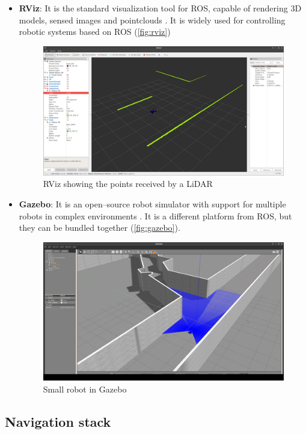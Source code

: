 \begin{itemize}
  \item \textbf{RViz}: It is the standard visualization tool for ROS, capable of rendering 3D models, sensed images and pointclouds . It is widely used for controlling robotic systems based on ROS (\autoref{fig:rviz})
  \begin{figure}[htb]
    \centering
    \includegraphics[width=.9\linewidth]{pictures/02/rviz}
    \caption{RViz showing the points received by a LiDAR}
    \label{fig:rviz}
  \end{figure}  

  \item \textbf{Gazebo}: It is an open--source robot simulator with support for multiple robots in complex environments . It is a different platform from ROS, but they can be bundled together (\autoref{fig:gazebo}).
  \begin{figure}[htb]
    \centering
    \includegraphics[width=.9\linewidth]{pictures/02/gazebo}
    \caption{Small robot in Gazebo}
    \label{fig:gazebo}
  \end{figure}  
\end{itemize}  

\subsection{Navigation stack}

